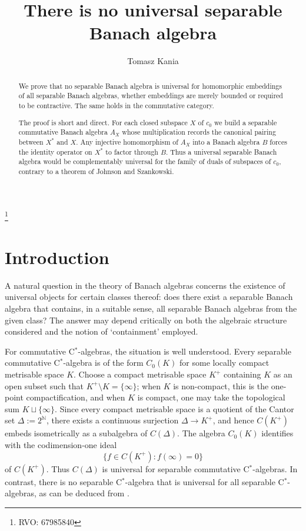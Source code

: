 \documentclass[11pt]{amsart}
\theoremstyle{plain}
\theoremstyle{remark}
\numberwithin{equation}{section}
\begin{document}
\title[There is no universal separable Banach algebra]{There is no universal separable Banach algebra}
\author{Tomasz Kania}
\date{}
\thanks{RVO: 67985840}

\begin{abstract}
We prove that no separable Banach algebra is universal for homomorphic embeddings of all separable Banach algebras, whether embeddings are merely bounded or required to be contractive. The same holds in the commutative category.

The proof is short and direct. For each closed subspace $X$ of $c_0$ we build a separable commutative Banach algebra $A_X$ whose multiplication records the canonical pairing between $X^*$ and $X$. Any injective homomorphism of $A_X$ into a Banach algebra $B$ forces the identity operator on $X^*$ to factor through $B$. Thus a universal separable Banach algebra would be complementably universal for the family of duals of subspaces of $c_0$, contrary to a theorem of Johnson and Szankowski.
\end{abstract}

\maketitle

\section{Introduction}

A natural question in the theory of Banach algebras concerns the existence of universal objects for certain classes thereof: does there exist a separable Banach algebra that contains, in a suitable sense, all separable Banach algebras from the given class? The answer may depend critically on both the algebraic structure considered and the notion of `containment' employed.

For commutative C$^*$-algebras, the situation is well understood. Every separable commutative C$^*$-algebra is of the form $C_0(K)$ for some locally compact metrisable space $K$. Choose a compact metrisable space $K^+$ containing $K$ as an open subset such that $K^+\setminus K=\{\infty\}$; when $K$ is non-compact, this is the one-point compactification, and when $K$ is compact, one may take the topological sum $K\sqcup\{\infty\}$. Since every compact metrisable space is a quotient of the Cantor set $\Delta := 2^{\mathbb N}$, there exists a continuous surjection $\Delta \to K^+$, and hence $C(K^+)$ embeds isometrically as a subalgebra of $C(\Delta)$. The algebra $C_0(K)$ identifies with the codimension-one ideal
\[
\{f\in C(K^+): f(\infty)=0\}
\]
of $C(K^+)$. Thus $C(\Delta)$ is universal for separable commutative C$^*$-algebras. In contrast, there is no separable C$^*$-algebra that is universal for all separable C$^*$-algebras, as can be deduced from \cite[Proposition~2.6]{JungePisier:1995}.
\end{document}
